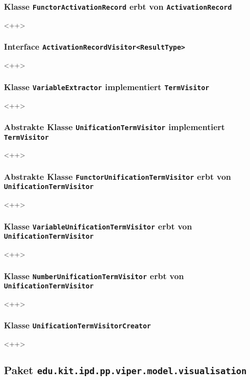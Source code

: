 \documentclass[parskip=full,11pt,twoside]{scrartcl}
\begin{document}
\subsubsection{Klasse \texttt{FunctorActivationRecord} erbt von \texttt{ActivationRecord}}
<++>

\subsubsection{Interface \texttt{ActivationRecordVisitor<ResultType>}}
<++>
\subsubsection{Klasse \texttt{VariableExtractor} implementiert \texttt{TermVisitor}}
<++>

\subsubsection{Abstrakte Klasse \texttt{UnificationTermVisitor} implementiert \texttt{TermVisitor}}
<++>

\subsubsection{Abstrakte Klasse \texttt{FunctorUnificationTermVisitor} erbt von \texttt{UnificationTermVisitor}}
<++>

\subsubsection{Klasse \texttt{VariableUnificationTermVisitor} erbt von \texttt{UnificationTermVisitor}}
<++>

\subsubsection{Klasse \texttt{NumberUnificationTermVisitor} erbt von \texttt{UnificationTermVisitor}}
<++>

\subsubsection{Klasse \texttt{UnificationTermVisitorCreator}}
<++>
\newpage
\subsection{Paket \texttt{edu.kit.ipd.pp.viper.model.visualisation}}
\end{document}

